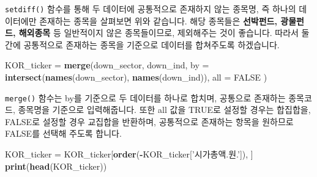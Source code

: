 \documentclass[12pt,]{book}
\newenvironment{Shaded}{\begin{snugshade}}{\end{snugshade}}
\newcommand{\DataTypeTok}[1]{\textcolor[rgb]{0.13,0.29,0.53}{#1}}
\newcommand{\KeywordTok}[1]{\textcolor[rgb]{0.13,0.29,0.53}{\textbf{#1}}}
\newcommand{\NormalTok}[1]{#1}
\newcommand{\OperatorTok}[1]{\textcolor[rgb]{0.81,0.36,0.00}{\textbf{#1}}}
\newcommand{\OtherTok}[1]{\textcolor[rgb]{0.56,0.35,0.01}{#1}}
\newcommand{\StringTok}[1]{\textcolor[rgb]{0.31,0.60,0.02}{#1}}
\begin{document}
\texttt{setdiff()} 함수를 통해 두 데이터에 공통적으로 존재하지 않는 종목명, 즉 하나의 데이터에만 존재하는 종목을 살펴보면 위와 같습니다. 해당 종목들은 \textbf{선박펀드, 광물펀드, 해외종목} 등 일반적이지 않은 종목들이므로, 제외해주는 것이 좋습니다. 따라서 둘간에 공통적으로 존재하는 종목을 기준으로 데이터를 합쳐주도록 하겠습니다.

\begin{Shaded}
\begin{Highlighting}[]
\NormalTok{KOR_ticker =}\StringTok{ }\KeywordTok{merge}\NormalTok{(down_sector, down_ind,}
                   \DataTypeTok{by =} \KeywordTok{intersect}\NormalTok{(}\KeywordTok{names}\NormalTok{(down_sector),}
                                  \KeywordTok{names}\NormalTok{(down_ind)),}
                   \DataTypeTok{all =} \OtherTok{FALSE}
\NormalTok{    )}
\end{Highlighting}
\end{Shaded}

\texttt{merge()} 함수는 by를 기준으로 두 데이터를 하나로 합치며, 공통으로 존재하는 종목코드, 종목명을 기준으로 입력해줍니다. 또한 all 값을 TRUE로 설정할 경우는 합집합을, FALSE로 설정할 경우 교집합을 반환하며, 공통적으로 존재하는 항목을 원하므로 FALSE를 선택해 주도록 합니다.

\begin{Shaded}
\begin{Highlighting}[]
\NormalTok{KOR_ticker =}\StringTok{ }\NormalTok{KOR_ticker[}\KeywordTok{order}\NormalTok{(}\OperatorTok{-}\NormalTok{KOR_ticker[}\StringTok{'시가총액.원.'}\NormalTok{]), ]}
\KeywordTok{print}\NormalTok{(}\KeywordTok{head}\NormalTok{(KOR_ticker))}
\end{Highlighting}
\end{Shaded}
\end{document}

